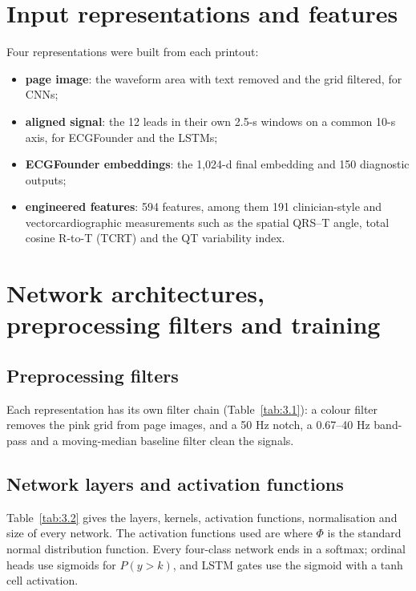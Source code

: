 \section{Input representations and features}\label{sec:3.4}

Four representations were built from each printout:

\begin{itemize}
  \item \textbf{page image}: the waveform area with text removed and the grid filtered, for CNNs;
  \item \textbf{aligned signal}: the 12 leads in their own 2.5-s windows on a common 10-s axis, for ECGFounder and the LSTMs;
  \item \textbf{ECGFounder embeddings}: the 1,024-d final embedding and 150 diagnostic outputs;
  \item \textbf{engineered features}: 594 features, among them 191 clinician-style and vectorcardiographic measurements such as the spatial QRS--T angle, total cosine R-to-T (TCRT) and the QT variability index.
\end{itemize}
\section{Network architectures, preprocessing filters and training}\label{sec:3.5}

\subsection{Preprocessing filters}\label{sec:3.5.1}



Each representation has its own filter chain (Table~\ref{tab:3.1}): a colour filter removes the pink grid from page images, and a 50 Hz notch, a 0.67--40 Hz band-pass and a moving-median baseline filter clean the signals.

\subsection{Network layers and activation functions}\label{sec:3.5.2}

Table~\ref{tab:3.2} gives the layers, kernels, activation functions, normalisation and size of every network. The activation functions used are
\EqThreeTwo
where $\Phi$ is the standard normal distribution function. Every four-class network ends in a softmax; ordinal heads use sigmoids for $ P(y> k)$, and LSTM gates use the sigmoid with a tanh cell activation.

